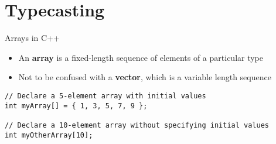 \part{Typecasting}
\frame{\partpage}

\begin{frame}[fragile]{Arrays in C++}
    \begin{itemize}
        \item An \textbf{array} is a fixed-length sequence of elements of a particular type \pause
        \item Not to be confused with a \textbf{vector}, which is a variable length sequence \pause
    \end{itemize}
    \begin{lstlisting}
// Declare a 5-element array with initial values
int myArray[] = { 1, 3, 5, 7, 9 };

// Declare a 10-element array without specifying initial values
int myOtherArray[10];
    \end{lstlisting}
\end{frame}
